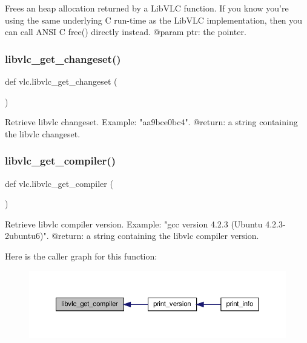 \begin{DoxyVerb}Frees an heap allocation returned by a LibVLC function.
If you know you're using the same underlying C run-time as the LibVLC
implementation, then you can call ANSI C free() directly instead.
@param ptr: the pointer.
\end{DoxyVerb}
 \mbox{\label{namespacevlc_abb66509718afd388f3b587c0e28813fa}} 
\subsubsection{\texorpdfstring{libvlc\+\_\+get\+\_\+changeset()}{libvlc\_get\_changeset()}}
{\footnotesize\ttfamily def vlc.\+libvlc\+\_\+get\+\_\+changeset (\begin{DoxyParamCaption}{ }\end{DoxyParamCaption})}

\begin{DoxyVerb}Retrieve libvlc changeset.
Example: "aa9bce0bc4".
@return: a string containing the libvlc changeset.
\end{DoxyVerb}
 \mbox{\label{namespacevlc_a10e241078a2da73d9ba308448d3c3192}} 
\subsubsection{\texorpdfstring{libvlc\+\_\+get\+\_\+compiler()}{libvlc\_get\_compiler()}}
{\footnotesize\ttfamily def vlc.\+libvlc\+\_\+get\+\_\+compiler (\begin{DoxyParamCaption}{ }\end{DoxyParamCaption})}

\begin{DoxyVerb}Retrieve libvlc compiler version.
Example: "gcc version 4.2.3 (Ubuntu 4.2.3-2ubuntu6)".
@return: a string containing the libvlc compiler version.
\end{DoxyVerb}
 Here is the caller graph for this function\+:
\nopagebreak
\begin{figure}[H]
\begin{center}
\leavevmode
\includegraphics[width=350pt]{namespacevlc_a10e241078a2da73d9ba308448d3c3192_icgraph}
\end{center}
\end{figure}
\mbox{\label{namespacevlc_a9533bb014114561474c90a91497dc7d6}} 
